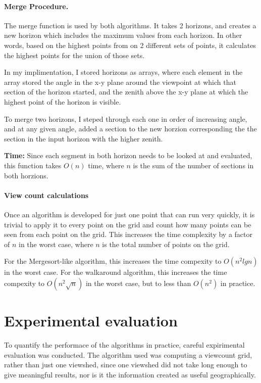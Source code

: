\documentclass[11pt,twocolumn]{article}
\begin{document}
\paragraph{Merge Procedure. }
The merge function is used by both algorithms.  It takes 2 horizons, and creates a new horizon which includes the maximum values from each horizon.  In other words, based on the highest points from on 2 different sets of points, it calculates the highest points for the union of those sets.

In my implimentation, I stored horizons as arrays, where each element in the array stored the angle in the x-y plane around the viewpoint at which that section of the horizon started, and the zenith above the x-y plane at which the highest point of the horizon is visible.

To merge two horizons, I steped through each one in order of increasing angle, and at any given angle, added a section to the new horzion corresponding the the section in the input horizon with the higher zenith.  

{\bf Time:} Since each segment in both horizon needs to be looked at and evaluated, this function takes $O(n)$ time, where $n$ is the sum of the number of sections in both horzions.


\paragraph{View count calculations}
Once an algorithm is developed for just one point that can run very quickly, it is trivial to apply it to every point on the grid and count how many points can be seen from each point on the grid.  This increases the time complexity by a factor of $n$ in the worst case, where $n$ is the total number of points on the grid.

For the Mergesort-like algorithm, this increases the time compexity to $O(n^2lgn)$ in the worst case.  For the walkaround algorithm, this increases the time compexity to $O(n^2\sqrt{n})$ in the worst case, but to less than $O(n^2)$ in practice.

\section{Experimental evaluation}

To quantify the performace of the algorithms in practice, careful expirimental evaluation was conducted.  The algorithm used was computing a viewcount grid, rather than just one viewshed, since one viewshed did not take long enough to give meaningful results, nor is it the information created as useful geographically.
\end{document}
